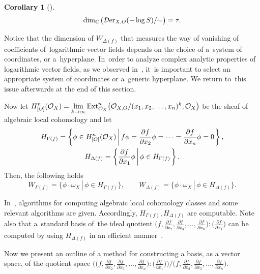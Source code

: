 \documentclass[pdftex]{sigma}%
\numberwithin{equation}{section}
\newtheorem{Corollary}[Theorem]{Corollary}
\newcommand{\Set}[1]{\left\{#1\right\}}
\newcommand{\setDef}[2]{{#1}\left|\,\vphantom{#1}{#2}\right.}%
\newcommand{\SetDef}[2]{\Set{\setDef{#1}{#2}}}
\begin{document}
\begin{Corollary}[\cite{T}]
\[
\dim_{{\mathbb C}}\big({\mathcal D}{\rm er}_{X, O}(-\log S)/{\sim}\big) = \tau.
\]
\end{Corollary}

Notice that the dimension of $W_{\Delta(f)}$ that measures the way of vanishing of coefficients of~loga\-rithmic vector fields depends on the choice of a~system of coordinates, or a~hyperplane. In~order to analyze complex analytic properties of logarithmic vector fields, as we observed in~\cite{T}, it~is important to select an appropriate system of coordinates or a~generic hyperplane. We return to~this issue afterwards at the end of this section.


Now let
$\displaystyle H_{[O]}^n({\mathcal O}_X) = \lim_{k \to \infty} {\rm Ext}_{{\mathcal O}_X}^n \big({\mathcal O}_{X,O}/(x_1,x_2,\ldots,x_n)^k, {\mathcal O}_X\big)$
be the sheaf of algebraic local cohomology and let
\begin{gather*}
H_{\Gamma(f)} = \SetDef{ \phi \in H_{[O]}^n({\mathcal O}_X) }{f\phi = \frac{\partial f}{\partial x_2}\phi = \cdots = \frac{\partial f}{\partial x_{n}}\phi = 0},
\\
H_{\Delta(f)} = \SetDef{\frac{\partial f}{\partial x_1}\phi}{\phi\in H_{\Gamma(f)}}.
\end{gather*}
Then, the following holds
\[
W_{\Gamma(f)} = \{\phi \cdot \omega_X \,|\, \phi \in H_{\Gamma(f)}\}, \qquad
W_{\Delta(f)} = \{\phi \cdot \omega_X \,|\, \phi \in H_{\Delta(f)}\}.
\]

In~\cite{TNN}, algorithms for computing algebraic local cohomology classes and some relevant algo\-rithms are given.
Accordingly, $ H_{\Gamma(f)}, H_{\Delta(f)} $ are computable. Note also that a~standard basis of~the ideal quotient
$\big(f, \frac{\partial f}{\partial x_2}, \frac{\partial f}{\partial x_3},\ldots,
\frac{\partial f}{\partial x_{n}}\big) : \big(\frac{\partial f}{\partial x_1}\big)$ can be computed by using $ H_{\Delta(f)} $ in an efficient manner~\cite{TNN}.


Now we present an outline of a method for constructing a basis, as a vector space, of the quotient space
$\big(\big(f, \frac{\partial f}{\partial x_2}, \frac{\partial f}{\partial x_3},\ldots,
\frac{\partial f}{\partial x_{n}}\big) : \big(\frac{\partial f}{\partial x_1}\big)\big)/\big(f, \frac{\partial f}{\partial x_2}, \frac{\partial f}{\partial x_3},\ldots,
\frac{\partial f}{\partial x_{n}}\big)$.
\end{document}
